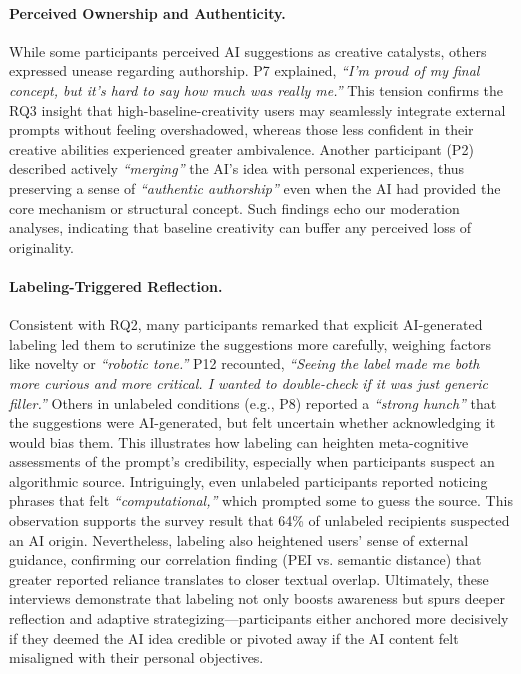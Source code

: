 \documentclass{article}
\begin{document}
\paragraph{Perceived Ownership and Authenticity.} While some participants perceived AI suggestions as creative catalysts, others expressed unease regarding authorship. P7 explained, \emph{“I’m proud of my final concept, but it’s hard to say how much was really me.”} This tension confirms the RQ3 insight that high-baseline-creativity users may seamlessly integrate external prompts without feeling overshadowed, whereas those less confident in their creative abilities experienced greater ambivalence. Another participant (P2) described actively \emph{“merging”} the AI’s idea with personal experiences, thus preserving a sense of \emph{“authentic authorship”} even when the AI had provided the core mechanism or structural concept. Such findings echo our moderation analyses, indicating that baseline creativity can buffer any perceived loss of originality.

\paragraph{Labeling-Triggered Reflection.} Consistent with RQ2, many participants remarked that explicit AI-generated labeling led them to scrutinize the suggestions more carefully, weighing factors like novelty or \emph{“robotic tone.”} P12 recounted, \emph{“Seeing the label made me both more curious and more critical. I wanted to double-check if it was just generic filler.”}  Others in unlabeled conditions (e.g., P8) reported a \emph{“strong hunch”} that the suggestions were AI-generated, but felt uncertain whether acknowledging it would bias them. This illustrates how labeling can heighten meta-cognitive assessments of the prompt’s credibility, especially when participants suspect an algorithmic source. Intriguingly, even unlabeled participants reported noticing phrases that felt \emph{“computational,”} which prompted some to guess the source. This observation supports the survey result that 64\% of unlabeled recipients suspected an AI origin. Nevertheless, labeling also heightened users’ sense of external guidance, confirming our correlation finding (PEI vs. semantic distance) that greater reported reliance translates to closer textual overlap. Ultimately, these interviews demonstrate that labeling not only boosts awareness but spurs deeper reflection and adaptive strategizing—participants either anchored more decisively if they deemed the AI idea credible or pivoted away if the AI content felt misaligned with their personal objectives.
\end{document}
